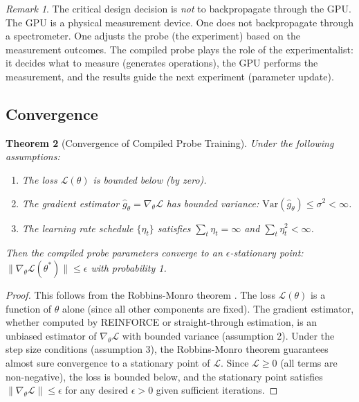 \documentclass[11pt,twocolumn,a4paper]{article}
\newtheorem{theorem}{Theorem}[section]
\theoremstyle{definition}
\theoremstyle{remark}
\newtheorem{remark}[theorem]{Remark}
\newcommand{\loss}{\mathcal{L}}
\newcommand{\params}{\theta}
\begin{document}
\begin{remark}
The critical design decision is \emph{not} to backpropagate through the GPU. The GPU is a physical measurement device. One does not backpropagate through a spectrometer. One adjusts the probe (the experiment) based on the measurement outcomes. The compiled probe plays the role of the experimentalist: it decides what to measure (generates operations), the GPU performs the measurement, and the results guide the next experiment (parameter update).
\end{remark}

\subsection{Convergence}

\begin{theorem}[Convergence of Compiled Probe Training]
\label{thm:convergence}
Under the following assumptions:
\begin{enumerate}[nosep]
\item The loss $\loss(\params)$ is bounded below (by zero).
\item The gradient estimator $\hat{g}_\params = \nabla_\params \loss$ has bounded variance: $\mathrm{Var}(\hat{g}_\params) \leq \sigma^2 < \infty$.
\item The learning rate schedule $\{\eta_t\}$ satisfies $\sum_t \eta_t = \infty$ and $\sum_t \eta_t^2 < \infty$.
\end{enumerate}
Then the compiled probe parameters converge to an $\epsilon$-stationary point: $\|\nabla_\params \loss(\params^*)\| \leq \epsilon$ with probability 1.
\end{theorem}

\begin{proof}
This follows from the Robbins-Monro theorem \citep{robbins1951}. The loss $\loss(\params)$ is a function of $\params$ alone (since all other components are fixed). The gradient estimator, whether computed by REINFORCE or straight-through estimation, is an unbiased estimator of $\nabla_\params \loss$ with bounded variance (assumption 2). Under the step size conditions (assumption 3), the Robbins-Monro theorem guarantees almost sure convergence to a stationary point of $\loss$. Since $\loss \geq 0$ (all terms are non-negative), the loss is bounded below, and the stationary point satisfies $\|\nabla_\params \loss\| \leq \epsilon$ for any desired $\epsilon > 0$ given sufficient iterations.
\end{proof}
\end{document}
